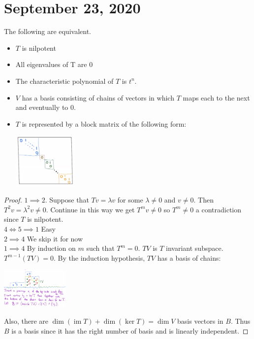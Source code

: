 \documentclass{article}
\DeclareMathOperator{\im}{im}
\begin{document}
\section{September 23, 2020}
\begin{proposition}
The following are equivalent.
\begin{itemize}
    \item $T$ is nilpotent
    \item All eigenvalues of T are 0
    \item The characteristic polynomial of $T$ is $t^n$.
    \item $V$ has a basis consisting of chains of vectors in which $T$ maps each to the next and eventually to 0.
    \item $T$ is represented by a block matrix of the following form:
    \begin{center}
        \includegraphics[width=0.25\textwidth]{Image 2 9232020.PNG}
    \end{center}
\end{itemize}
\end{proposition}
\begin{proof}
$1\implies 2$. Suppose that $Tv=\lambda v$ for some $\lambda\neq 0$ and $v\neq 0$. Then $T^2 v=\lambda^2 v\neq 0$. Continue in this way we get $T^m v\neq 0$ so $T^m\neq 0$ a contradiction since $T$ is nilpotent.
\\
$4\iff 5\implies 1$ Easy
\\
$2\implies 4$ We skip it for now
\\
$1\implies 4$ By induction on $m$ such that $T^m=0$. $TV$ is $T$ invariant subspace. $T^{m-1}(TV)=0$. By the induction hypothesis, $TV$ has a basis of chains:
\begin{center}
   \includegraphics[width=0.25\textwidth]{Image 1 9232020.PNG}
\end{center}
Also, there are $\dim(\im T)+\dim(\ker T)=\dim V$ basis vectors in $B$. Thus $B$ is a basis since it has the right number of basis and is linearly independent.
\end{proof}
\end{document}
